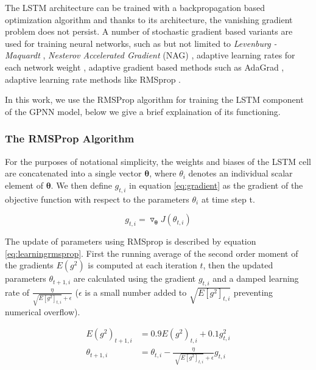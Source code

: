 The LSTM architecture can be trained with a backpropagation based optimization algorithm and thanks to 
its architecture, the vanishing gradient problem does not persist. A number of stochastic gradient based 
variants are used for training neural networks, such as but not limited to \emph{Levenburg - Maquardt} 
\citep{marquardt1963algorithm}, \emph{Nesterov Accelerated Gradient} (NAG) \citep{nesterov1983method}, 
adaptive learning rates for each network weight \citep{SilvaAlmeida}, adaptive gradient based methods such as 
AdaGrad \citep{duchi2011adaptive}, adaptive learning rate methods like RMSprop \citep{tieleman2012lecture}. 

In this work, we use the RMSProp algorithm for training the LSTM component of the GPNN model, below we give 
a brief explaination of its functioning.

\subsubsection*{The RMSProp Algorithm}

For the purposes of notational simplicity, the weights and biases of the LSTM cell are concatenated into a 
single vector $\mathbf{\theta}$, where $\theta_i$ denotes an individual scalar element of $\mathbf{\theta}$. 
We then define \( g_{t,i} \) in equation \ref{eq:gradient} as the gradient of the objective function with respect 
to the parameters \(   \theta_{i} \) at time step t. 

\begin{equation}\label{eq:gradient}
 g_{t,i} = \triangledown_{ \mathbf{\theta} } J \left(  \theta_{t,i} \right)
\end{equation}

The update of parameters using RMSprop is described by equation \ref{eq:learningrmsprop}. First the running average 
of the second order moment of the gradients \( E \left( g^{2} \right)  \) is computed at each iteration $t$, then 
the updated parameters $\theta_{t+1,i}$ are calculated using the gradient $g_{t,i}$ and a damped learning rate of 
$\frac{\eta}{\sqrt{E \left[ g^{2} \right]_{t,i}} + \epsilon }$ ($\epsilon$ is a small number added to 
$\sqrt{E \left[ g^{2} \right]_{t,i}}$ preventing numerical overflow).


\begin{align}\label{eq:learningrmsprop}
 E \left( g^{2} \right)_{t+1,i} &= 0.9 E \left( g^{2} \right)_{t,i} + 0.1 g_{t,i}^{2}  \\ 
 \theta_{t+1,i} &= \theta_{t,i} - \frac{ \eta }{\sqrt[]{E \left[ g^{2} \right]_{t,i}} + \epsilon } g_{t,i}
\end{align}


